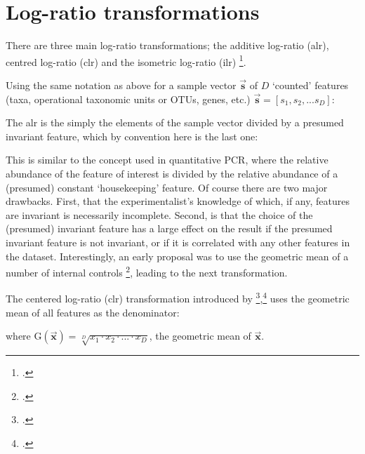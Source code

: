 \section{Log-ratio transformations}
There are three main log-ratio transformations; the additive log-ratio (alr), centred log-ratio (clr) and the isometric log-ratio (ilr) \footcite{pawlowsky2015modeling}.

Using the same notation as above for a sample vector  $\vec{\textbf{s}}$ of $D$ `counted' features (taxa, operational taxonomic units or OTUs, genes, etc.) $\vec{\textbf{s}}=[s_1, s_2, ... s_D]$:

The alr is the simply the elements of the sample vector divided by a presumed invariant feature, which by convention here is the last one:


This is similar to the concept used in quantitative PCR, where the relative abundance of the feature of interest is divided by the relative abundance of a (presumed) constant `housekeeping' feature. Of course there are two major drawbacks. First, that the experimentalist's knowledge of which, if any, features are invariant is necessarily incomplete. Second, is that the choice of the (presumed) invariant feature has a large effect on the result if the presumed invariant feature is not invariant, or if it is correlated with any other features in the dataset. Interestingly, an early proposal was to use the geometric mean of a number of internal controls \footcite{Vandesompele:2002aa}, leading to the next transformation.

The centered log-ratio (clr) transformation introduced by \footcite{Ait1983},\footcite{Aitchison:1986} uses the geometric mean of all features as the denominator:

where $\mathrm{G}(\vec{\textbf{x}}) = \sqrt[D]{x_1 \cdot x_2 \cdot ... \cdot x_D}$, the geometric mean of $\vec{\textbf{x}}$.

